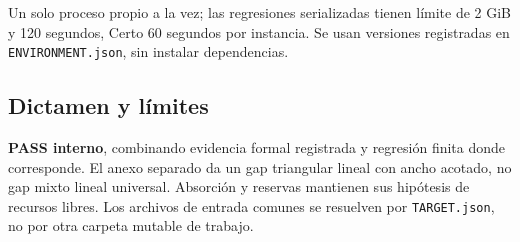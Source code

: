 Un solo proceso propio a la vez; las regresiones serializadas tienen
límite de 2 GiB y 120 segundos, Certo 60 segundos por instancia. Se usan
versiones registradas en \texttt{ENVIRONMENT.json}, sin instalar
dependencias.

\subsection{Dictamen y límites}\label{dictamen-y-luxedmites}

\textbf{PASS interno}, combinando evidencia formal registrada y
regresión finita donde corresponde. El anexo separado da un gap
triangular lineal con ancho acotado, no gap mixto lineal universal.
Absorción y reservas mantienen sus hipótesis de recursos libres. Los
archivos de entrada comunes se resuelven por \texttt{TARGET.json}, no
por otra carpeta mutable de trabajo.
